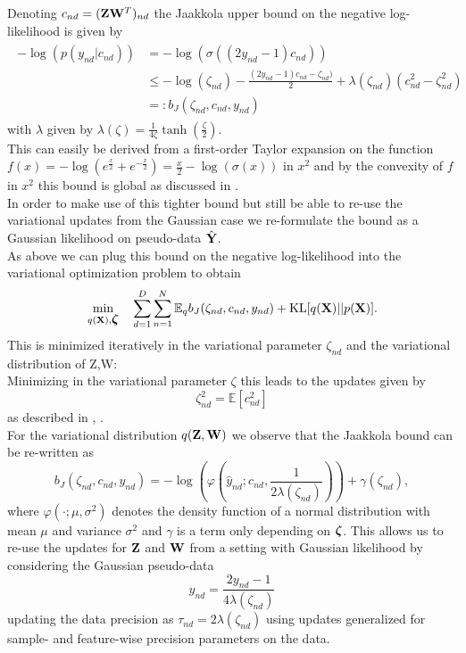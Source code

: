 Denoting $c_{nd}=({\bf Z}{\bf W}^T)_{nd}$ the Jaakkola upper bound \cite{Jaakkola} on the negative log-likelihood is given by
\begin{align*}
\begin{split}
-\log\left(p(y_{nd}|c_{nd})\right) &= -\log\left(\sigma\left((2y_{nd}-1)  c_{nd}\right)\right)\\
& \leq -\log(\zeta_{nd})-\frac{(2y_{nd}-1)c_{nd}-\zeta_{nd})}{2} +\lambda(\zeta_{nd})\left(c_{nd}^2 -\zeta_{nd}^2 \right)\\
& =: b_J(\zeta_{nd}, c_{nd},y_{nd} )
\label{jaakkola}
\end{split}
\end{align*}
with $\lambda$ given by $\lambda(\zeta)=\frac{1}{4\zeta}\tanh\left(\frac{\zeta}{2}\right)$.\\
This can easily be derived from a first-order Taylor expansion on the function $f(x) = - \log(e^{\frac{x}{2}}+e^{-\frac{x}{2}}) = \frac{x}{2}-\log(\sigma(x))$ in $x^2$ and by the convexity of 
$f$ in $x^2$ this bound is global as discussed in \cite{Jaakkola}.\\
In order to make use of this tighter bound but still be able to re-use the variational updates from the Gaussian case we re-formulate the bound as a Gaussian likelihood on pseudo-data $\hat{{\bf Y}}$.\\
As above we can plug this bound on the negative log-likelihood into the variational optimization problem to obtain  \begin{equation*}
\min_{q({\bf X}),\mbox{\boldmath $\zeta$}} \quad \sum_{d=1}^{D}\sum_{n=1}^{N} \mathbb{E}_q b_J(\zeta_{nd}, c_{nd},y_{nd} ) + {\rm KL}[q({\bf X})||p({\bf X})].
\end{equation*}
This is minimized iteratively in the variational parameter $\zeta_{nd}$ and the variational distribution of Z,W:\\
Minimizing in the variational parameter $\zeta$ this leads to the updates given by
\begin{equation*}
\zeta_{nd}^2 = \mathbb{E}[c_{nd}^2]
\end{equation*}
as described in \cite{Jaakkola}, \cite{bishop2006pattern}.\\
For the variational distribution $q({\bf Z},{\bf W})$ we observe that the Jaakkola bound can be re-written as 
\begin{equation*}
b_J(\zeta_{nd}, c_{nd},y_{nd} ) = -\log\left(\varphi\left(\hat{y}_{nd}; c_{nd}, \frac{1}{2\lambda(\zeta_{nd})}\right)\right) + \gamma(\zeta_{nd}),
\end{equation*}
where $\varphi(\cdot; \mu, \sigma^2)$ denotes the density function of a normal distribution with mean $\mu$ and variance $\sigma^2$ and $\gamma$ is a term only depending on $\mbox{\boldmath $\zeta$}$. This allows us to re-use the updates for ${\bf Z}$ and ${\bf W}$ from a setting with Gaussian likelihood by considering the Gaussian pseudo-data 
\begin{equation*}
\hat{y}_{nd}= \frac{2y_{nd}-1}{4 \lambda(\zeta_{nd})}
\end{equation*}
updating the data precision as $\tau_{nd} = 2\lambda(\zeta_{nd})$ using  updates generalized for sample- and feature-wise precision parameters on the data.


